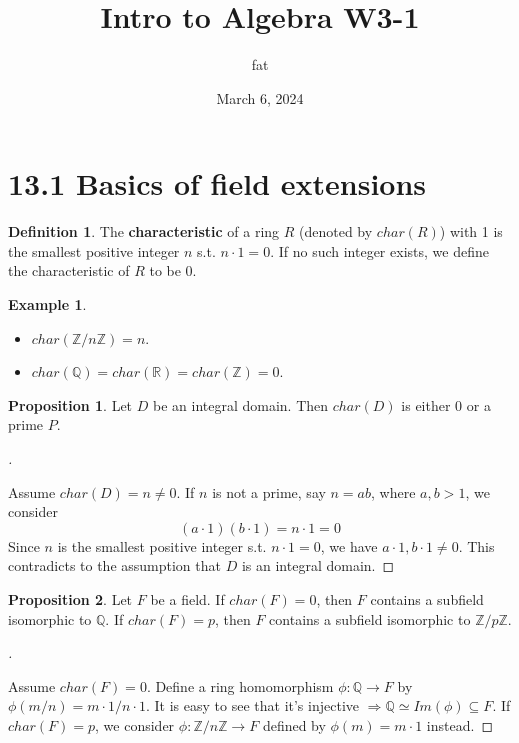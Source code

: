 \documentclass{article}
\title{Intro to Algebra W3-1}
\author{fat}
\date{March 6, 2024}
\theoremstyle{definition}
\newtheorem{ex}{Example}
\newtheorem{dfn}{Definition}
\newtheorem{prop}{Proposition}
\newenvironment{proofs}[1][\proofname]{%
  \begin{proof}[#1]$ $\par\nobreak\ignorespaces
}{%
  \end{proof}
}
\begin{document}
\maketitle
\thispagestyle{fancy}
\renewcommand{\footrulewidth}{0.4pt}
\cfoot{\thepage}
\renewcommand{\headrulewidth}{0.4pt}

\section*{13.1 Basics of field extensions}

\begin{dfn}
	The \textbf{characteristic} of a ring $R$ (denoted by $char(R)$) with 1 is the smallest positive integer $n$ s.t. $n \cdot 1 = 0$. 
	If no such integer exists, we define the characteristic of $R$ to be 0.
\end{dfn}

\begin{ex}
	\begin{itemize}
		\item $char (\mathbb{Z}/n \mathbb{Z}) = n$.
			
		\item $char(\mathbb{Q}) = char(\mathbb{R}) = char(\mathbb{Z}) = 0$.
	\end{itemize}
\end{ex}

\begin{prop}
	Let $D$ be an integral domain. 
	Then $char(D)$ is either 0 or a prime $P$.
\end{prop}

\begin{proofs}
	Assume $char(D) = n \neq 0$.
	If $n$ is not a prime, say $n = ab$, where $a, b > 1$, we consider 
	\[
		(a \cdot 1) (b \cdot 1) = n \cdot 1 = 0
	\]
	Since $n$ is the smallest positive integer s.t. $n \cdot 1 = 0$, we have $a \cdot 1, b \cdot 1 \neq 0$. 
	This contradicts to the assumption that $D$ is an integral domain.
\end{proofs}

\begin{prop}
	Let $F$ be a field. 
	If $char(F) = 0$, then $F$ contains a subfield isomorphic to $\mathbb{Q}$. 
	If $char(F) = p$, then $F$ contains a subfield isomorphic to $\mathbb{Z}/p\mathbb{Z}$.
\end{prop}

\begin{proofs}
	Assume $char(F) = 0$. 
	Define a ring homomorphism $\phi:\mathbb{Q} \to F$ by $\phi(m/n) = m \cdot 1 / n \cdot 1$.
	It is easy to see that it's injective $\Rightarrow \mathbb{Q} \simeq Im(\phi) \subseteq F$.
	If $char(F) = p$, we consider $\phi:\mathbb{Z}/n \mathbb{Z} \to F$ defined by $\phi(m) = m \cdot 1$ instead.
\end{proofs}
\end{document}

